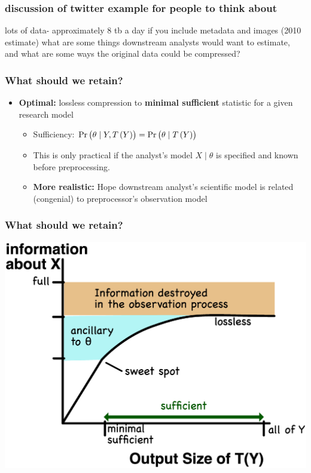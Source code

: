 \documentclass[10pt, compress]{beamer}
\begin{document}
\begin{frame}[fragile]
    \frametitle{discussion of twitter example for people to think about}

 lots of data- approximately 8 tb a day if you include metadata and images (2010 estimate)
 what are some things downstream analysts would want to estimate, and what are some ways the original data could be compressed?
\end{frame}

\begin{frame}[fragile]
    \frametitle{What should we retain?}
    \begin{itemize}
    	\item \textbf{Optimal:} lossless compression to \textbf{minimal sufficient} statistic for a given research model
    		\begin{itemize}
    			\item Sufficiency: $\Pr\del{\theta \mid Y,T\del{Y}}=\Pr\del{\theta \mid T\del{Y}}$
    			\item This is only practical if the analyst's model $X \mid \theta$ is specified and known before preprocessing.
    			\item \textbf{More realistic:} Hope downstream analyst's scientific model is related (congenial) to preprocessor's observation model
    		\end{itemize}
    \end{itemize}
\end{frame}
\begin{frame}[fragile]
    \frametitle{What should we retain?}
    \includegraphics[width=\textwidth]{assets/information.eps}
\end{frame}
\end{document}
